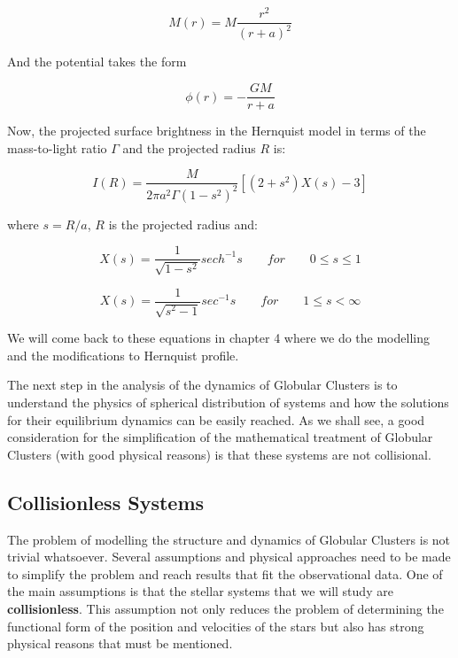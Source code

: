 \begin{equation}
M(r)=M\frac{r^{2}}{\left(r+a\right)^{2}}
\end{equation}  

And the potential takes the form

\begin{equation}
\phi(r)=-\frac{GM}{r+a}
\end{equation}

Now, the projected surface brightness in the Hernquist model in terms of the mass-to-light ratio $\Gamma$ and the projected radius $R$ is: 
 
\begin{equation}
I(R)=\frac{M}{2\pi a^{2}\Gamma\left(1-s^{2}\right)^{2}}\left[\left(2+s^{2}\right)X(s)-3\right]
\end{equation}
 
where $s=R/a$, $R$ is the projected radius and:

\begin{equation}
X(s)=\frac{1}{\sqrt{1-s^{2}}}sech^{-1}s\qquad for\qquad0\leq s\leq1
\end{equation}

\begin{equation}
X(s)=\frac{1}{\sqrt{s^{2}-1}}sec^{-1}s\qquad for\qquad1\leq s<\infty
\end{equation}

We will come back to these equations in chapter 4 where we do the modelling and the modifications to Hernquist profile.

The next step in the analysis of the dynamics of Globular Clusters is to understand the physics of spherical distribution of systems and how the solutions for their equilibrium dynamics can be easily reached. As we shall see, a good consideration for the simplification of the mathematical treatment of Globular Clusters (with good physical reasons) is that these systems are not collisional.

\subsection{Collisionless Systems}

The problem of modelling the structure and dynamics of Globular Clusters is not trivial whatsoever. Several assumptions and physical approaches need to be made to simplify the problem and reach results that fit the observational data. One of the main assumptions is that the stellar systems that we will study are \textbf{collisionless}. This assumption not only reduces the problem of determining the functional form of the position and velocities of the stars but also has strong physical reasons that must be mentioned.

